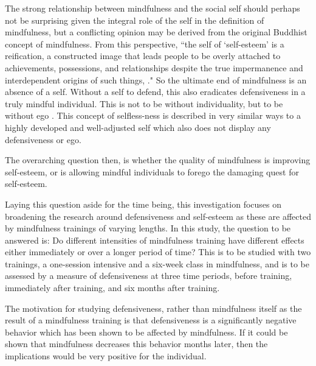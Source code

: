 \documentclass[jou]{apa}
\begin{document}
The strong relationship between mindfulness and the social self should perhaps not be surprising given the integral role of the self in the definition of mindfulness, but a conflicting opinion may be derived from the original Buddhist concept of mindfulness.  From this perspective, ``the self of `self-esteem' is a reification, a constructed image that leads people to be overly attached to achievements, possessions, and relationships despite the true impermanence and interdependent origins of such things, \cite{ryan2003}."  So the ultimate end of mindfulness is an absence of a self.  Without a self to defend, this also eradicates defensiveness in a truly mindful individual.  This is not to be without individuality, but to be without ego \cite{ryan2003}.  This concept of selfless-ness is described in very similar ways to a highly developed and well-adjusted self which also does not display any defensiveness or ego.  

The overarching question then, is whether the quality of mindfulness is improving self-esteem, or is allowing mindful individuals to forego the damaging quest for self-esteem.  


Laying this question aside for the time being, this investigation focuses on broadening the research around defensiveness and self-esteem as these are affected by mindfulness trainings of varying lengths.  In this study, the question to be answered is: Do different intensities of mindfulness training have different effects either immediately or over a longer period of time?  This is to be studied with two trainings, a one-session intensive and a six-week class in mindfulness, and is to be assessed by a measure of defensiveness at three time periods, before training, immediately after training, and six months after training. 

The motivation for studying defensiveness, rather than mindfulness itself as the result of a mindfulness training is that defensiveness is a significantly negative behavior which has been shown to be affected by mindfulness.  If it could be shown that mindfulness decreases this behavior months later, then the implications would be very positive for the individual.  
\end{document}
